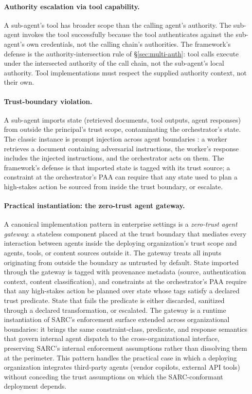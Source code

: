 \documentclass[11pt,a4paper]{article}
\theoremstyle{remark}
\begin{document}
\paragraph{Authority escalation via tool capability.} A sub-agent's tool has broader scope than the calling agent's authority. The sub-agent invokes the tool successfully because the tool authenticates against the sub-agent's own credentials, not the calling chain's authorities. The framework's defense is the authority-intersection rule of \S\ref{sec:multi-auth}: tool calls execute under the intersected authority of the call chain, not the sub-agent's local authority. Tool implementations must respect the supplied authority context, not their own.

\paragraph{Trust-boundary violation.} A sub-agent imports state (retrieved documents, tool outputs, agent responses) from outside the principal's trust scope, contaminating the orchestrator's state. The classic instance is prompt injection across agent boundaries \cite{greshake2023injection,debenedetti2024agentdojo}: a worker retrieves a document containing adversarial instructions, the worker's response includes the injected instructions, and the orchestrator acts on them. The framework's defense is that imported state is tagged with its trust source; a constraint at the orchestrator's PAA can require that any state used to plan a high-stakes action be sourced from inside the trust boundary, or escalate.

\paragraph{Practical instantiation: the zero-trust agent gateway.} A canonical implementation pattern in enterprise settings is a \emph{zero-trust agent gateway}: a stateless component placed at the trust boundary that mediates every interaction between agents inside the deploying organization's trust scope and agents, tools, or content sources outside it. The gateway treats all inputs originating from outside the boundary as untrusted by default. State imported through the gateway is tagged with provenance metadata (source, authentication context, content classification), and constraints at the orchestrator's PAA require that any high-stakes action be planned over state whose tags satisfy a declared trust predicate. State that fails the predicate is either discarded, sanitized through a declared transformation, or escalated. The gateway is a runtime instantiation of SARC's enforcement surface extended across organizational boundaries: it brings the same constraint-class, predicate, and response semantics that govern internal agent dispatch to the cross-organizational interface, preserving SARC's internal enforcement assumptions rather than dissolving them at the perimeter. This pattern handles the practical case in which a deploying organization integrates third-party agents (vendor copilots, external API tools) without conceding the trust assumptions on which the SARC-conformant deployment depends.
\end{document}
